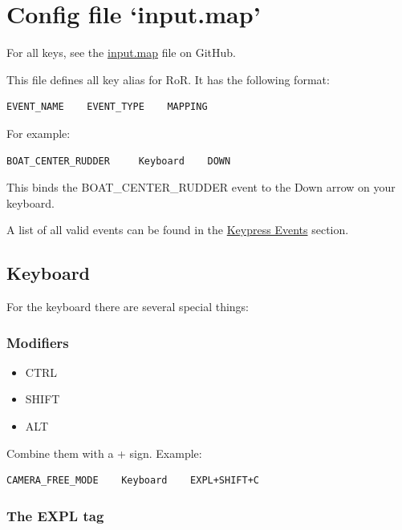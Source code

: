 \hypertarget{config-file-input.map}{%
\section{Config file `input.map'}\label{config-file-input.map}}

For all keys, see the
\href{https://github.com/RigsOfRods/rigs-of-rods/blob/master/resources/skeleton/config/input.map}{input.map}
file on GitHub.

This file defines all key alias for RoR. It has the following format:

\begin{verbatim}
EVENT_NAME    EVENT_TYPE    MAPPING
\end{verbatim}

For example:

\begin{verbatim}
BOAT_CENTER_RUDDER     Keyboard    DOWN
\end{verbatim}

This binds the BOAT\_CENTER\_RUDDER event to the Down arrow on your
keyboard.

A list of all valid events can be found in the
\protect\hyperlink{keypress-events}{Keypress Events} section.

\hypertarget{keyboard}{%
\subsection{Keyboard}\label{keyboard}}

For the keyboard there are several special things:

\hypertarget{modifiers}{%
\subsubsection{Modifiers}\label{modifiers}}

\begin{itemize}
\tightlist
\item
  CTRL
\item
  SHIFT
\item
  ALT
\end{itemize}

Combine them with a + sign. Example:

\begin{verbatim}
CAMERA_FREE_MODE    Keyboard    EXPL+SHIFT+C
\end{verbatim}

\hypertarget{the-expl-tag}{%
\subsubsection{The EXPL tag}\label{the-expl-tag}}

